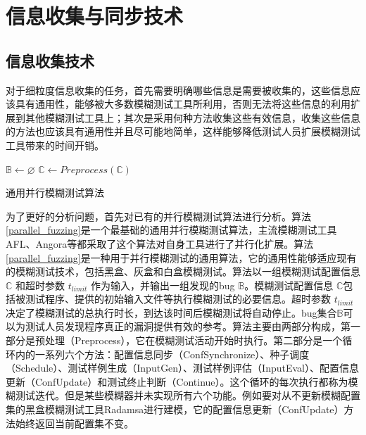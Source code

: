 \documentclass[master]{thesis-uestc}
\begin{document}
\section{信息收集与同步技术}

\subsection{信息收集技术}
对于细粒度信息收集的任务，首先需要明确哪些信息是需要被收集的，这些信息应该具有通用性，能够被大多数模糊测试工具所利用，否则无法将这些信息的利用扩展到其他模糊测试工具上；其次是采用何种方法收集这些有效信息，收集这些信息的方法也应该具有通用性并且尽可能地简单，这样能够降低测试人员扩展模糊测试工具带来的时间开销。

\begin{algorithm}[!htbp]
    $\mathbb{B} \leftarrow \varnothing$ \;
    $\mathbb{C} \leftarrow Preprocess(\mathbb{C})$\;
    \caption{通用并行模糊测试算法}
    \label{parallel_fuzzing}
\end{algorithm}

为了更好的分析问题，首先对已有的并行模糊测试算法进行分析。算法\ref{parallel_fuzzing}是一个最基础的通用并行模糊测试算法，主流模糊测试工具AFL、Angora等都采取了这个算法对自身工具进行了并行化扩展。算法\ref{parallel_fuzzing}是一种用于并行模糊测试的通用算法，它的通用性能够适应现有的模糊测试技术，包括黑盒、灰盒和白盒模糊测试。算法以一组模糊测试配置信息 $\mathbb{C}$ 和超时参数 $t_{limit}$ 作为输入，并输出一组发现的bug  $\mathbb{B}$。模糊测试配置信息 $\mathbb{C}$包括被测试程序、提供的初始输入文件等执行模糊测试的必要信息。超时参数 $t_{limit}$决定了模糊测试的总执行时长，到达该时间后模糊测试将自动停止。bug集合$\mathbb{B}$可以为测试人员发现程序真正的漏洞提供有效的参考。算法主要由两部分构成，第一部分是预处理（Preprocess），它在模糊测试活动开始时执行。第二部分是一个循环内的一系列六个方法：配置信息同步（ConfSynchronize）、种子调度（Schedule）、测试样例生成（InputGen）、测试样例评估（InputEval）、配置信息更新（ConfUpdate）和测试终止判断（Continue）。这个循环的每次执行都称为模糊测试迭代。但是某些模糊器并未实现所有六个功能。例如要对从不更新模糊配置集的黑盒模糊测试工具Radamsa进行建模，它的配置信息更新（ConfUpdate）方法始终返回当前配置集不变。
\end{document}
